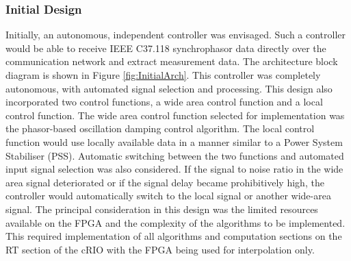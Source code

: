 \documentclass[conference]{IEEEtran}
\begin{document}
\subsubsection{Initial Design}
Initially, an autonomous, independent controller was envisaged. Such a controller would be able to receive IEEE C37.118 synchrophasor data directly over the communication network and extract measurement data. The architecture block diagram is shown in Figure  \ref{fig:InitialArch}. This controller was completely autonomous, with automated signal selection and processing. This design also incorporated two control functions, a wide area control function and a local control function. The wide area control function selected for implementation was the phasor-based oscillation damping control algorithm\cite{PhasorPOD}. The local control function would use locally available data in a manner similar to a Power System Stabiliser (PSS). Automatic switching between the two functions and automated input signal selection was also considered. If the signal to noise ratio in the wide area signal deteriorated or if the signal delay became prohibitively high, the controller would automatically switch to the local signal or another wide-area signal. The principal consideration in this design was the limited resources available on the FPGA and the complexity of the algorithms to be implemented. This required implementation of all algorithms and computation sections on the RT section of the cRIO with the FPGA being used for interpolation only. %

\end{document}
